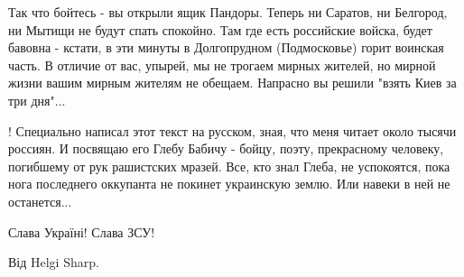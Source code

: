 Так что бойтесь - вы открыли ящик Пандоры. Теперь ни Саратов, ни Белгород, ни
Мытищи не будут спать спокойно. Там где есть российские войска, будет бавовна -
кстати, в эти минуты в Долгопрудном (Подмосковье) горит воинская часть. В
отличие от вас, упырей, мы не трогаем мирных жителей, но мирной жизни вашим
мирным жителям не обещаем. Напрасно вы решили "взять Киев за три дня"...

! Специально написал этот текст на русском, зная, что меня читает около тысячи
россиян. И посвящаю его Глебу Бабичу - бойцу, поэту, прекрасному человеку,
погибшему от рук рашистских мразей. Все, кто знал Глеба, не успокоятся, пока
нога последнего оккупанта не покинет украинскую землю. Или навеки в ней не
останется...

Слава Україні! Слава ЗСУ!

Від Helgi Sharp.

